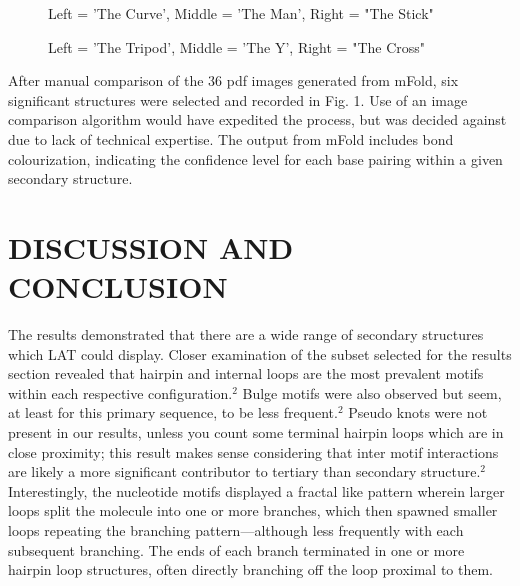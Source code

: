 \documentclass[letterpaper, 10 pt, conference]{ieeeconf}  %
\begin{document}
\begin{figure}[h]
    \centering

    \caption{Left = 'The Curve', Middle = 'The Man', Right = "The Stick"}
\end{figure}
\begin{figure}[h]
    \centering

    \caption{Left = 'The Tripod', Middle = 'The Y', Right = "The Cross"}
\end{figure}

After manual comparison of the 36 pdf images generated from mFold, six significant structures were selected and recorded in Fig. 1. Use of an image comparison algorithm would have expedited the process, but was decided against due to lack of technical expertise. The output from mFold includes bond colourization, indicating the confidence level for each base pairing within a given secondary structure.

\section{DISCUSSION AND CONCLUSION}

The results demonstrated that there are a wide range of secondary structures which LAT could display. Closer examination of the subset selected for the results section revealed that hairpin and internal loops are the most prevalent motifs within each respective configuration.$^2$ Bulge motifs were also observed but seem, at least for this primary sequence, to be less frequent.$^2$ Pseudo knots were not present in our results, unless you count some terminal hairpin loops which are in close proximity; this result makes sense considering that inter motif interactions are likely a more significant contributor to tertiary than secondary structure.$^2$ Interestingly, the nucleotide motifs displayed a fractal like pattern wherein larger loops split the molecule into one or more branches, which then spawned smaller loops repeating the branching pattern---although less frequently with each subsequent branching. The ends of each branch terminated in one or more hairpin loop structures, often directly branching off the loop proximal to them. 
\end{document}

